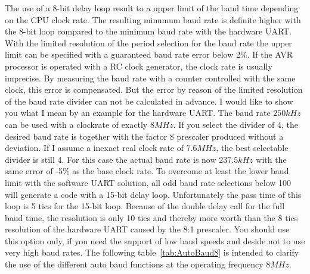 The use of a 8-bit delay loop result to a upper limit of the baud time
depending on the CPU clock rate.
The resulting minumum baud rate is definite higher with the 8-bit loop
compared to the minimum baud rate with the hardware UART.
With the limited resolution of the period selection for the baud rate
the upper limit can be specified with a guaranteed baud rate error below 2\%.
If the AVR processor is operated with a RC clock generator, the clock rate
is usually imprecise. By measuring the baud rate with a counter controlled
with the same clock, this error is compensated.
But the error by reason of the limited resolution of the baud rate divider 
can not be calculated in advance.
I would like to show you what I mean by an example for the hardware UART. 
The baud rate \(250kHz\) can be used with a clockrate of exactly \(8MHz\).
If you select the divider of 4, the desired baud rate is together with
the factor 8 prescaler produced without a deviation.
If I assume a inexact real clock rate of \(7.6MHz\),
the best selectable divider is still 4.
For this case the actual baud rate is now \(237.5kHz\) with the same
error of -5\% as the base clock rate.
To overcome at least the lower baud limit with the software UART solution,
all odd baud rate selections below 100 will generate a code
with a 15-bit delay loop.
Unfortunately the pass time of this loop is 5 tics for the 15-bit loop.
Because of the double delay call for the full baud time,
the resolution is only 10 tics and thereby more worth than the 
8 tics resolution of the hardware UART caused by the 8:1 prescaler.
You should use this option only, if you need the support of low baud speeds
and deside not to use very high baud rates.
The following table~\ref{tab:AutoBaud8} is intended to clarify the use of
the different auto baud functions at the operating frequency \(8MHz\).

